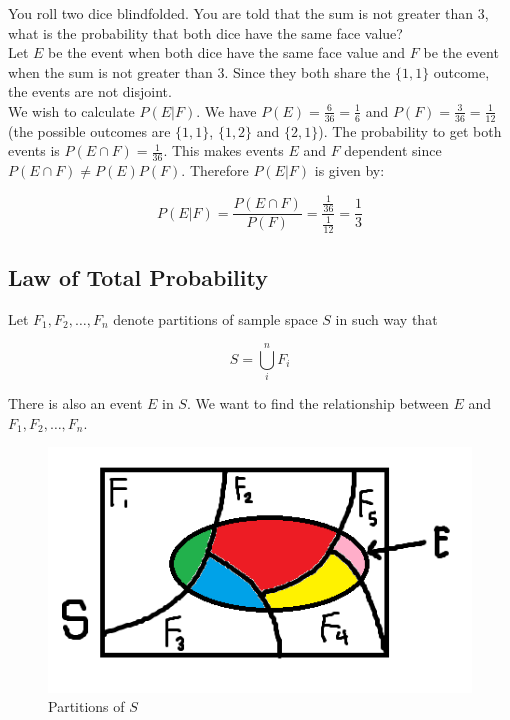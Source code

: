 \begin{texample}
	You roll two dice blindfolded. You are told that the sum is not greater than $3$, what is the probability that both dice have the same face value? \\
	
	Let $E$ be the event when both dice have the same face value and $F$ be the event when the sum is not greater than $3$. Since they both share the $\{1, 1\}$ outcome, the events are not disjoint. \\
	
	We wish to calculate $P(E|F)$. We have $P(E)=\frac{6}{36}=\frac16$ and $P(F)=\frac{3}{36}=\frac{1}{12}$ (the possible outcomes are $\{1, 1\}$, $\{1, 2\}$ and $\{2, 1\}$). The probability to get both events is $P(E \cap F)=\frac{1}{36}$. This makes events $E$ and $F$ dependent since $P(E \cap F) \ne P(E)P(F)$. Therefore $P(E|F)$ is given by:
	
	$$P(E|F)=\frac{P(E \cap F)}{P(F)}=\frac{\frac{1}{36}}{\frac{1}{12}}=\frac{1}{3}$$
\end{texample}

\subsection{Law of Total Probability}

Let $F_1, F_2, \dots, F_n$ denote partitions of sample space $S$ in such way that

$$S=\bigcup_i^n F_i$$

There is also an event $E$ in $S$. We want to find the relationship between $E$ and $F_1, F_2, \dots, F_n$.

\begin{figure}[H]
	\centering
	\includegraphics[width=130mm]{2.png}
	\caption{Partitions of $S$}
\end{figure}


